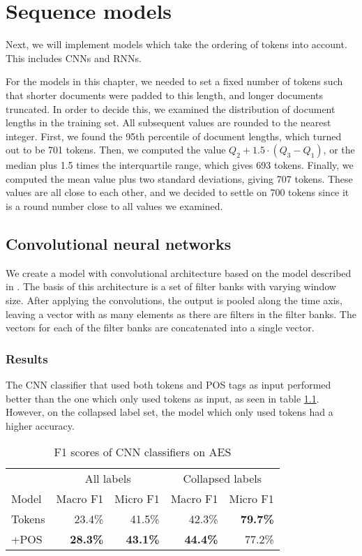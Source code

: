 \chapter{Sequence models}

Next, we will implement models which take the ordering of tokens into
account. This includes \acp{CNN} and \acp{RNN}.

For the models in this chapter, we needed to set a fixed number of tokens
such that shorter documents were padded to this length, and longer documents
truncated. In order to decide this, we examined the distribution of document
lengths in the training set. All subsequent values are rounded to the nearest
integer. First, we found the 95th percentile of document lengths, which
turned out to be 701 tokens. Then, we computed the value $Q_2 + 1.5 \cdot
(Q_3 - Q_1)$, or the median plus 1.5 times the interquartile range, which
gives 693 tokens. Finally, we computed the mean value plus two standard
deviations, giving 707 tokens. These values are all close to each other, and
we decided to settle on 700 tokens since it is a round number close to all
values we examined.


\section{Convolutional neural networks}

We create a model with convolutional architecture based on the model
described in \textcite{zhang2017sensitivity}. The basis of this architecture
is a set of filter banks with varying window size. After applying the
convolutions, the output is pooled along the time axis, leaving a vector with
as many elements as there are filters in the filter banks. The vectors for
each of the filter banks are concatenated into a single vector.


\subsection{Results}

The \ac{CNN} classifier that used both tokens and POS tags as input performed
better than the one which only used tokens as input, as seen in table
\ref{cnn-results}. However, on the collapsed label set, the model which only
used tokens had a higher accuracy.

\begin{table}
  \centering
  \begin{tabular}{|l|rr|rr|}
    \toprule
            & \multicolumn{2}{c|}{All labels} & \multicolumn{2}{c|}{Collapsed labels} \\
    Model     & Macro F1        & Micro F1        & Macro F1        & Micro F1        \\
    \midrule
    Tokens    &         23.4\%  &         41.5\%  &         42.3\%  & \textbf{79.7\%} \\
    +POS      & \textbf{28.3\%} & \textbf{43.1\%} & \textbf{44.4\%} &         77.2\%  \\
    \bottomrule
  \end{tabular}
  \caption{F1 scores of CNN classifiers on AES}
  \label{cnn-results}
\end{table}


